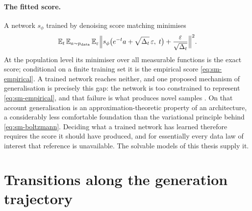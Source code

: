 \paragraph{The fitted score.} A network $s_\phi$ trained by denoising score
matching \citep{hyvarinen2005estimation, vincent2011connection} minimises
\begin{equation}
  \mathbb{E}_{t}\, \mathbb{E}_{a \sim p_{\mathrm{data}}}\, \mathbb{E}_{\varepsilon}
  \Big\lVert
    s_\phi\big(e^{-t} a + \sqrt{\Delta_t}\,\varepsilon,\; t\big)
    + \frac{\varepsilon}{\sqrt{\Delta_t}}
  \Big\rVert^{2}.
  \label{eq:sm-dsm}
\end{equation}
At the population level its minimiser over all measurable functions is the
exact score; conditional on a finite training set it is the empirical score
\eqref{eq:sm-empirical}. A trained network reaches neither, and one proposed
mechanism of generalisation is precisely this gap: the network is too
constrained to represent \eqref{eq:sm-empirical}, and that failure is what
produces novel samples \citep{kadkhodaie2024generalization,
kamb2024analytic}. On that account generalisation is an
approximation-theoretic property of an architecture, a considerably less
comfortable foundation than the variational principle behind
\eqref{eq:sm-boltzmann}. Deciding what a trained network has learned therefore
requires the score it should have produced, and for essentially every data law
of interest that reference is unavailable. The solvable models of this thesis
supply it.

\section{Transitions along the generation trajectory}
\label{sec:sm-transitions}

